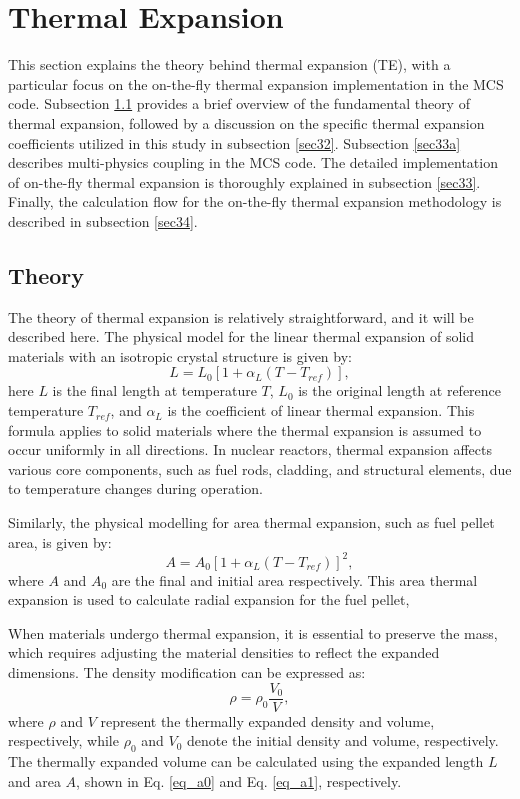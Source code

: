 \newpage 
\section{Thermal Expansion} \label{s3}
This section explains the theory behind thermal expansion (TE), with a particular focus on the on-the-fly thermal expansion implementation in the MCS code. Subsection \ref{sec31} provides a brief overview of the fundamental theory of thermal expansion, followed by a discussion on the specific thermal expansion coefficients utilized in this study in subsection \ref{sec32}. Subsection \ref{sec33a} describes multi-physics coupling in the MCS code. The detailed implementation of on-the-fly thermal expansion is thoroughly explained in subsection \ref{sec33}. Finally, the calculation flow for the on-the-fly thermal expansion methodology is described in subsection \ref{sec34}.

\subsection{Theory} \label{sec31}

The theory of thermal expansion is relatively straightforward, and it will be described here. The physical model for the linear thermal expansion of solid materials with an isotropic crystal structure is given by:
\begin{equation}
    L=L_0\left[1+\alpha_L\left(T-T_{ref}\right)\right],
    \label{eq_a0}
\end{equation}
here $L$ is the final length at temperature $T$, $L_0$ is the original length at reference temperature $T_{ref}$, and $\alpha_L$ is the coefficient of linear thermal expansion.
This formula applies to solid materials where the thermal expansion is assumed to occur uniformly in all directions. In nuclear reactors, thermal expansion affects various core components, such as fuel rods, cladding, and structural elements, due to temperature changes during operation.

Similarly, the physical modelling for area thermal expansion, such as fuel pellet area, is given by: 
\begin{equation}
    A=A_0\left[1+\alpha_L\left(T-T_{ref}\right)\right]^2,
    \label{eq_a1}
\end{equation}
where $A$ and $A_0$ are the final and initial area respectively. This area thermal expansion is used to calculate radial expansion for the fuel pellet,

When materials undergo thermal expansion, it is essential to preserve the mass, which requires adjusting the material densities to reflect the expanded dimensions. The density modification can be expressed as:
\begin{equation}
    \rho=\rho_0\frac{V_0}{V},
\end{equation}
where $\rho$ and $V$ represent the thermally expanded density and volume, respectively, while $\rho_0$ and $V_0$ denote the initial density and volume, respectively. The thermally expanded volume can be calculated using the expanded length $L$ and area $A$, shown in Eq. \ref{eq_a0} and Eq. \ref{eq_a1}, respectively.

